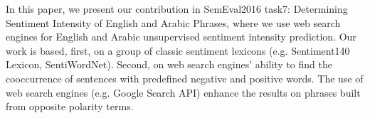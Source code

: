 In this paper, we present our contribution in SemEval2016 task7: Determining Sentiment Intensity of English and Arabic Phrases, where we use web search engines for English and Arabic unsupervised sentiment intensity prediction. Our work is based, first, on a group of classic sentiment lexicons (e.g. Sentiment140 Lexicon, SentiWordNet). Second, on web search engines' ability to find the cooccurrence of sentences with predefined negative and positive words. The use of web search engines (e.g. Google Search API) enhance the results on phrases built from opposite polarity terms.
